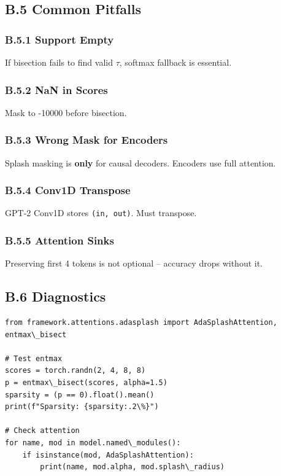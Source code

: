 \subsection{B.5 Common Pitfalls}

\subsubsection{B.5.1 Support Empty}

If bisection fails to find valid $\tau$, softmax fallback is essential.

\subsubsection{B.5.2 NaN in Scores}

Mask to -10000 before bisection.

\subsubsection{B.5.3 Wrong Mask for Encoders}

Splash masking is \textbf{only} for causal decoders. Encoders use full attention.

\subsubsection{B.5.4 Conv1D Transpose}

GPT-2 Conv1D stores \texttt{(in, out)}. Must transpose.

\subsubsection{B.5.5 Attention Sinks}

Preserving first 4 tokens is not optional -- accuracy drops without it.

\subsection{B.6 Diagnostics}

\begin{lstlisting}
from framework.attentions.adasplash import AdaSplashAttention, entmax\_bisect

# Test entmax
scores = torch.randn(2, 4, 8, 8)
p = entmax\_bisect(scores, alpha=1.5)
sparsity = (p == 0).float().mean()
print(f"Sparsity: {sparsity:.2\%}")

# Check attention
for name, mod in model.named\_modules():
    if isinstance(mod, AdaSplashAttention):
        print(name, mod.alpha, mod.splash\_radius)
\end{lstlisting}